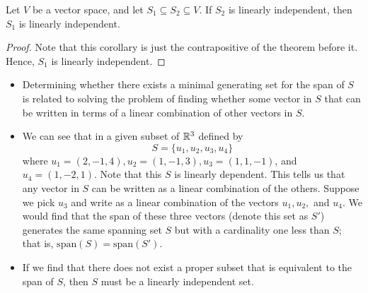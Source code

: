 \begin{corollary}\label{Corollary to Theorem 1.6}
   Let \( V  \) be a vector space, and let \( S_{1} \subseteq S_{2} \subseteq V  \). If \( S_{2}  \) is linearly independent, then \( S_{1}  \) is linearly independent. 
\end{corollary}
\begin{proof}
    Note that this corollary is just the contrapositive of the theorem before it. Hence, \( S_{1}  \) is linearly independent.
\end{proof}

\begin{itemize}
    \item Determining whether there exists a minimal generating set for the span of \( S  \) is related to solving the problem of finding whether some vector in \( S  \) that can be written in terms of a linear combination of other vectors in \( S  \). 
    \item We can see that in a given subset of \( \mathbb{R}^{3}  \) defined by 
        \[  S = \{ u_{1}, u_{2}, u_{3}, u_{4}  \}  \] where \( u_{1} = (2,-1,4) , u_{2} = (1,-1, 3), u_{3} = (1,1,-1) \), and \( u_{4} = (1,-2,1) \). Note that this \( S  \) is linearly dependent. This tells us that any vector in \( S  \) can be written as a linear combination of the others. Suppose we pick \( u_{3}  \) and write as a linear combination of the vectors \( u_{1}, u_{2},  \) and \( u_{4} \). We would find that the span of these three vectors (denote this set as \( S' \)) generates the same spanning set \( S  \) but with a cardinality one less than \( S  \); that is, \( \text{span}(S) = \text{span}(S') \). 
    \item If we find that there does not exist a proper subset that is equivalent to the span of \( S  \), then \( S  \) must be a linearly independent set.
\end{itemize}

